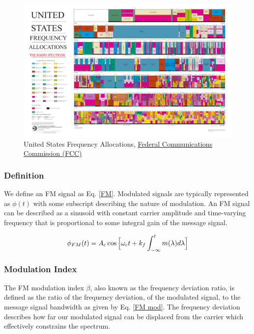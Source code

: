 \begin{figure}
    \centering
    \includegraphics[scale=0.5, width=175mm]{images/United_States_Frequency_Allocations_Chart_2016_-_The_Radio_Spectrum.pdf}
    \caption{United States Frequency Allocations, \href{https://www.fcc.gov/engineering-technology/policy-and-rules-division/general/radio-spectrum-allocation}{Federal Communications Commission (FCC)}}
    \label{fig:RF}
\end{figure}

\subsubsection{Definition}
We define an FM signal as Eq. \ref{FM}. Modulated signals are typically represented as $\phi(t)$ with some subscript describing the nature of modulation. An FM signal can be described as a sinusoid with constant carrier amplitude and time-varying frequency that is proportional to some integral gain of the message signal.


\begin{equation} \label{FM}
    \phi_{FM}(t) = A_c \cos \Big{[}\omega_ct + k_f \int_{-\infty}^{t} m(\lambda) d \lambda \Big{]}
\end{equation}

\subsubsection{Modulation Index}
The FM modulation index $\beta$, also known as the frequency deviation ratio, is defined as the ratio of the frequency deviation, of the modulated signal, to the message signal bandwidth as given by Eq. \ref{FM mod}. The frequency deviation describes how far our modulated signal can be displaced from the carrier which effectively constrains the spectrum.

